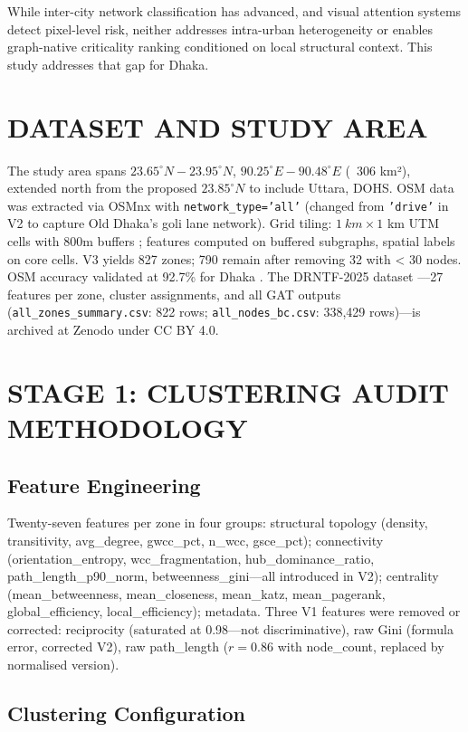 \documentclass[sigconf, nonacm]{acmart}
\begin{document}
While inter-city network classification has advanced, and visual attention systems detect pixel-level risk, neither addresses intra-urban heterogeneity or enables graph-native criticality ranking conditioned on local structural context. This study addresses that gap for Dhaka.

\section{DATASET AND STUDY AREA}
The study area spans $23.65^{\circ}N-23.95^{\circ}N$, $90.25^{\circ}E-90.48^{\circ}E$ (~306 km²), extended north from the proposed $23.85^{\circ}N$ to include Uttara, DOHS. OSM data was extracted via OSMnx with \texttt{network\_type='all'} (changed from \texttt{'drive'} in V2 to capture Old Dhaka's goli lane network). Grid tiling: $1~km\times1$ km UTM cells with 800m buffers \cite{he2023}; features computed on buffered subgraphs, spatial labels on core cells. V3 yields 827 zones; 790 remain after removing 32 with < 30 nodes. OSM accuracy validated at 92.7\% for Dhaka \cite{hassanzadeh2023}. The DRNTF-2025 dataset \cite{galib2025}---27 features per zone, cluster assignments, and all GAT outputs (\texttt{all\_zones\_summary.csv}: 822 rows; \texttt{all\_nodes\_bc.csv}: 338,429 rows)---is archived at Zenodo under CC BY 4.0.

\section{STAGE 1: CLUSTERING AUDIT METHODOLOGY}


\subsection{Feature Engineering}

Twenty-seven features per zone in four groups: structural topology (density, transitivity, avg\_degree, gwcc\_pct, n\_wcc, gsce\_pct); connectivity (orientation\_entropy, wcc\_fragmentation, hub\_dominance\_ratio, path\_length\_p90\_norm, betweenness\_gini—all introduced in V2); centrality (mean\_betweenness, mean\_closeness, mean\_katz, mean\_pagerank, global\_efficiency, local\_efficiency); metadata. Three V1 features were removed or corrected: reciprocity (saturated at 0.98—not discriminative), raw Gini (formula error, corrected V2), raw path\_length ($r = 0.86$ with node\_count, replaced by normalised version).

\subsection{Clustering Configuration}
\end{document}
